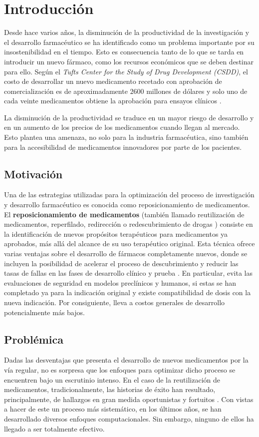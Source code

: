 \chapter*{Introducción}\label{chapter:introduction}

Desde hace varios años, la disminución de la productividad de la investigación y el desarrollo farmacéutico se ha identificado como un problema importante por su insostenibilidad en el tiempo. Esto es consecuencia tanto de lo que se tarda en introducir un nuevo fármaco, como los recursos económicos que se deben destinar para ello. Según el \textit{Tufts Center for the Study of Drug Development (CSDD)}, el costo de desarrollar un nuevo medicamento recetado con aprobación de comercialización es de aproximadamente $2600$ millones de dólares y solo uno de cada veinte medicamentos obtiene la aprobación para ensayos clínicos \cite{alcim}. 

La disminución de la productividad se traduce en un mayor riesgo de desarrollo y en un aumento de los precios de los medicamentos cuando llegan al mercado. Esto plantea una amenaza, no solo para la industria farmacéutica, sino también para la accesibilidad de medicamentos innovadores por parte de los pacientes.

\section*{Motivación}
Una de las estrategias utilizadas para la optimización del proceso de investigación y desarrollo farmacéutico es conocida como reposicionamiento de medicamentos.
El \textbf{reposicionamiento de medicamentos} (también llamado reutilización de medicamentos, reperfilado, redirección o redescubrimiento de drogas \cite{repurposingconcept}) consiste en la identificación de nuevos propósitos terapéuticos para medicamentos ya aprobados, más allá del alcance de su uso terapéutico original. Esta técnica ofrece varias ventajas sobre el desarrollo de fármacos completamente nuevos, donde se incluyen la posibilidad de acelerar el proceso de descubrimiento y reducir las tasas de fallas en las fases de desarrollo clínico y prueba \cite{advantages}. En particular, evita las evaluaciones de seguridad en modelos preclínicos y humanos, si estas se han completado ya para la indicación original y existe compatibilidad de dosis con la nueva indicación. Por consiguiente, lleva a costos generales de desarrollo potencialmente más bajos.

\section*{Problémica}
Dadas las desventajas que presenta el desarrollo de nuevos medicamentos por la vía regular, no es sorpresa que los enfoques para optimizar dicho proceso se encuentren bajo un escrutinio intenso. En el caso de la reutilización de medicamentos, tradicionalmente, las historias de éxito han resultado, principalmente, de hallazgos en gran medida oportunistas y fortuitos \cite{drugfindings}. Con vistas a hacer de este un proceso más sistemático, en los últimos años, se han desarrollado diversos enfoques computacionales. Sin embargo, ninguno de ellos ha llegado a ser totalmente efectivo. 

